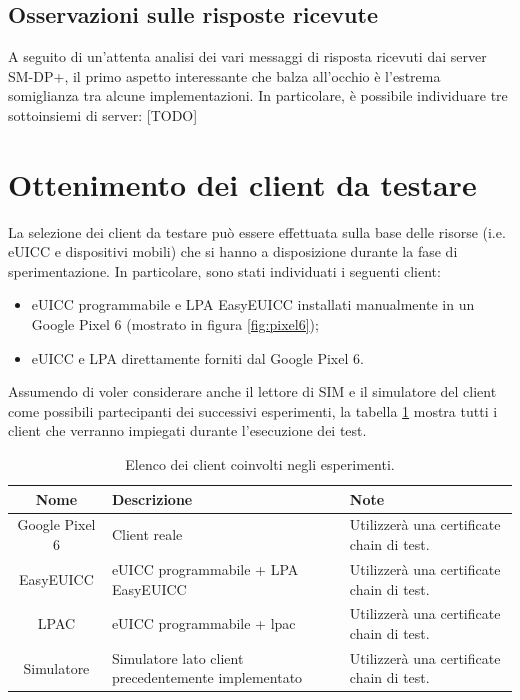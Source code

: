 \documentclass[10pt, oneside]{book}
\begin{document}
\subsection{Osservazioni sulle risposte ricevute}
A seguito di un'attenta analisi dei vari messaggi di risposta ricevuti dai server SM-DP+, il primo aspetto interessante che balza all'occhio è l'estrema somiglianza tra alcune implementazioni. In particolare, è possibile individuare tre sottoinsiemi di server: [TODO]

\section{Ottenimento dei client da testare}
La selezione dei client da testare può essere effettuata sulla base delle risorse (i.e. eUICC e dispositivi mobili) che si hanno a disposizione durante la fase di sperimentazione. In particolare, sono stati individuati i seguenti client:
\begin{itemize}
\item eUICC programmabile e LPA EasyEUICC installati manualmente in un Google Pixel 6 (mostrato in figura \ref{fig:pixel6});
\item eUICC e LPA direttamente forniti dal Google Pixel 6.
\end{itemize}
Assumendo di voler considerare anche il lettore di SIM e il simulatore del client come possibili partecipanti dei successivi esperimenti, la tabella \ref{tab:all-clients} mostra tutti i client che verranno impiegati durante l'esecuzione dei test.\\

\begin{table}[h!]
\begin{center}
\captionsetup{skip=4pt}
\caption{Elenco dei client coinvolti negli esperimenti.}
\label{tab:all-clients}
\begin{tabularx}{\textwidth}{|c|X|X|} %
\hline
\textbf{Nome} & \textbf{Descrizione} & \textbf{Note}\\
\hline
Google Pixel 6 & Client reale & Utilizzerà una certificate chain di test.\\
\hline
EasyEUICC & eUICC programmabile + LPA EasyEUICC & Utilizzerà una certificate chain di test.\\
\hline
LPAC & eUICC programmabile + lpac & Utilizzerà una certificate chain di test.\\
\hline
Simulatore & Simulatore lato client precedentemente implementato & Utilizzerà una certificate chain di test.\\
\hline
\end{tabularx}
\end{center}
\end{table}
\end{document}
